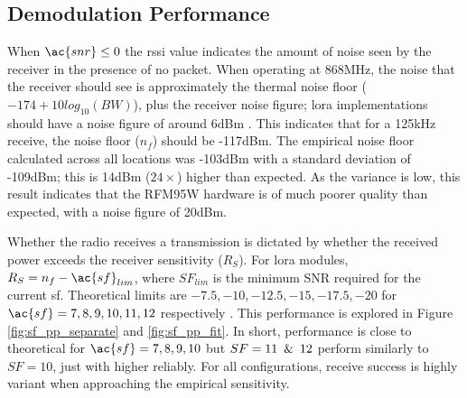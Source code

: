 \subsection{Demodulation Performance}
When $\ac{snr} \leq 0$ the \ac{rssi} value indicates the amount of noise seen by the receiver in the presence of no packet. When operating at 868MHz, the noise that the receiver should see is approximately the thermal noise floor ($-174+10log_{10}(BW)$), plus the receiver noise figure; \ac{lora} implementations should have a noise figure of around 6dBm \cite{3YP:LORA_MOD_BASICS}. This indicates that for a 125kHz receive, the noise floor ($n_f$) should be -117dBm. The empirical noise floor calculated across all locations was -103dBm with a standard deviation of -109dBm; this is 14dBm ($24\times$) higher than expected. As the variance is low, this result indicates that the RFM95W hardware is of much poorer quality than expected, with a noise figure of 20dBm.

Whether the radio receives a transmission is dictated by whether the received power exceeds the receiver sensitivity ($R_S$). For \ac{lora} modules, $R_S = n_f - \ac{sf}_{lim}$, where $SF_{lim}$ is the minimum SNR required for the current \ac{sf}. Theoretical limits are $-7.5, -10, -12.5, -15, -17.5, -20$ for $\ac{sf} = 7, 8, 9, 10, 11, 12$ respectively \cite{3YP:LORA_SX12}. This performance is explored in Figure \ref{fig:sf_pp_separate} and \ref{fig:sf_pp_fit}. In short, performance is close to theoretical for $\ac{sf} = 7, 8, 9, 10$ but $SF=11\enskip \& \enskip 12$ perform similarly to $SF=10$, just with higher reliably. For all configurations, receive success is highly variant when approaching the empirical sensitivity.

